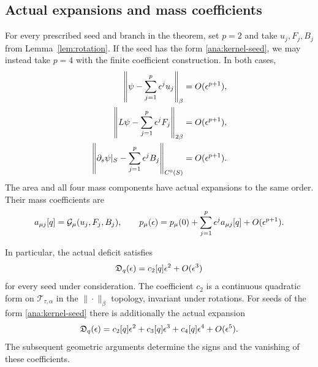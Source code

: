 \subsection{Actual expansions and mass coefficients}

\begin{proposition}
\label{prop:expansions}
For every prescribed seed and branch in the theorem, set $p=2$ and
take $u_j,F_j,B_j$ from Lemma~\ref{lem:rotation}.  If the seed has the
form \eqref{ana:kernel-seed}, we may instead take $p=4$ with the
finite coefficient construction.  In both cases,
\begin{align}
 \left\|\psi-\sum_{j=1}^p\epsilon^ju_j\right\|_\beta
     &=O(\epsilon^{p+1}),\notag\\
 \left\|L\psi-\sum_{j=1}^p\epsilon^jF_j\right\|_{2\beta}
     &=O(\epsilon^{p+1}),\notag\\
 \left\|\partial_s\psi|_S-\sum_{j=1}^p\epsilon^jB_j\right\|_{C^0(S)}
     &=O(\epsilon^{p+1}).
 \label{ana:three-remainders}
\end{align}
The area and all four mass components have actual expansions to the
same order.  Their mass coefficients are
\begin{equation}
 a_{\mu j}[q]=\mathcal G_\mu(u_j,F_j,B_j),\qquad
 p_\mu(\epsilon)=p_\mu(0)+\sum_{j=1}^p\epsilon^j a_{\mu j}[q]
                      +O(\epsilon^{p+1}).
 \label{ana:mass-coefficients}
\end{equation}

In particular, the actual deficit satisfies
\begin{equation}
 \mathfrak D_q(\epsilon)=c_2[q]\epsilon^2+O(\epsilon^3)
 \label{ana:deficit-second}
\end{equation}
for every seed under consideration.  The coefficient $c_2$ is a
continuous quadratic form on $\mathscr T_{\tau,\alpha}$ in the
$\|\cdot\|_\beta$ topology, invariant under rotations.  For seeds
of the form \eqref{ana:kernel-seed} there is additionally the actual
expansion
\begin{equation}
 \mathfrak D_q(\epsilon)
     =c_2[q]\epsilon^2+c_3[q]\epsilon^3+c_4[q]\epsilon^4+O(\epsilon^5).
 \label{ana:deficit-fourth}
\end{equation}
The subsequent geometric arguments determine the signs and the
vanishing of these coefficients.
\end{proposition}

